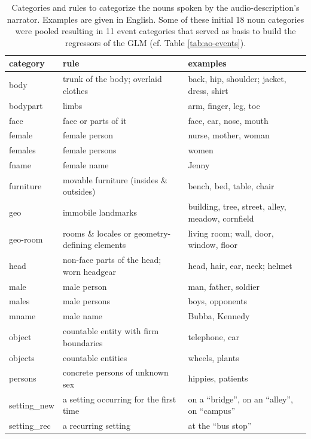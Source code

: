 \documentclass[english]{article}
\begin{document}
\begin{table}[h!]
    \caption{Categories and rules to categorize the nouns spoken by
        the audio-description's narrator.
        Examples are given in English.
        Some of these initial 18 noun categories were pooled resulting in 11
        event categories that served as basis to build the regressors of the
        GLM
        (cf. Table \ref{tab:ao-events}).
}
\label{tab:descr-nouns-rules}
\begin{tabular}{lll}
\toprule
\textbf{category} & \textbf{rule} & \textbf{examples} \\
\midrule
body & trunk of the body; overlaid clothes & back, hip, shoulder; jacket, dress, shirt
\tabularnewline
bodypart & limbs & arm, finger, leg, toe
\tabularnewline
face & face or parts of it & face, ear, nose, mouth
\tabularnewline
female & female person & nurse, mother, woman
\tabularnewline
females & female persons & women
\tabularnewline
fname & female name & Jenny
\tabularnewline
    furniture & movable furniture (insides \& outsides) & bench, bed, table,
    chair
\tabularnewline
geo & immobile landmarks & building, tree, street, alley, meadow, cornfield \tabularnewline
geo-room & rooms \& locales or geometry-defining elements & living room; wall, door, window, floor
\tabularnewline
head & non-face parts of the head; worn headgear & head, hair, ear, neck;
helmet
\tabularnewline
male & male person & man, father, soldier
\tabularnewline
males & male persons & boys, opponents
\tabularnewline
mname & male name & Bubba, Kennedy
\tabularnewline
object & countable entity with firm boundaries & telephone, car
\tabularnewline
objects & countable entities & wheels, plants
\tabularnewline
persons & concrete persons of unknown sex & hippies, patients
\tabularnewline
setting\_new & a setting occurring for the first time & on a ``bridge'', on an ``alley'', on ``campus''
\tabularnewline
setting\_rec & a recurring setting & at the ``bus stop'' \tabularnewline
\bottomrule
\end{tabular}
\end{table}
\end{document}
